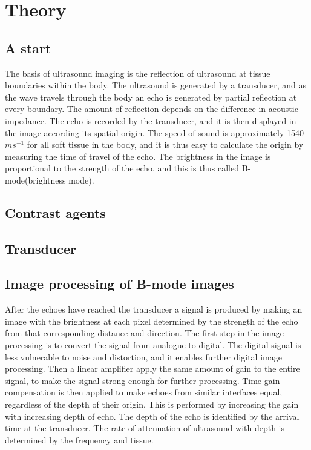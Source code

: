 \section{Theory}
\subsection{A start}
The basis of ultrasound imaging is the reflection of ultrasound at tissue boundaries within the body. The ultrasound is generated by a transducer, and as the wave travels through the body an echo is generated by partial reflection at every boundary. The amount of reflection depends on the difference in acoustic impedance. The echo is recorded by the transducer, and it is then displayed in the image according its spatial origin. The speed of sound is approximately 1540 $m s^{-1}$ for all soft tissue in the body, and it is thus easy to calculate the origin by measuring the time of travel of the echo.  The brightness in the image is proportional to the strength of the echo, and this is thus called B-mode(brightness mode).



\subsection{Contrast agents}


\subsection{Transducer}


\subsection{Image processing of B-mode images}
After the echoes have reached the transducer a signal is produced by making an image with the brightness at each pixel determined by the strength of the echo from that corresponding distance and direction. The first step in the image processing is to convert the signal from analogue to digital. The digital signal is less vulnerable to noise and distortion, and it enables further digital image processing. Then a linear amplifier apply the same amount of gain to the entire signal, to make the signal strong enough for further processing. Time-gain compensation is then applied to make echoes from similar interfaces equal, regardless of the depth of their origin. This is performed by increasing the gain with increasing depth of echo. The depth of the echo is identified by the arrival time at the transducer. The rate of attenuation of ultrasound with depth is determined by the frequency and tissue.

